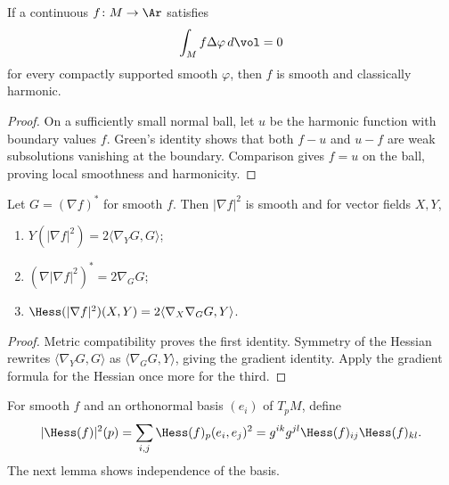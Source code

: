 \begin{theorem}
\label{thm:weak-harmonic-regularity}
\label{eqnlocmax}

If a continuous $f\colon M\to\Ar$ satisfies
$$\int_M f\Delta\varphi\,d\vol=0$$
for every compactly supported smooth $\varphi$, then $f$ is smooth and
classically harmonic.
\end{theorem}
\begin{proof}
\sketch
{}
On a sufficiently small normal ball, let $u$ be the harmonic function
with boundary values $f$. Green's identity shows that both $f-u$ and
$u-f$ are weak subsolutions vanishing at the boundary. Comparison gives
$f=u$ on the ball, proving local smoothness and harmonicity.
\end{proof}

\begin{lemma}
\label{lem:gradient-norm-sq-gradient}
\leanok



Let $G=(\nabla f)^*$ for smooth $f$. Then $|\nabla f|^2$ is smooth and
for vector fields $X,Y$,
\begin{enumerate}
\item $Y(|\nabla f|^2)=2\langle\nabla_YG,G\rangle$;
\item $(\nabla|\nabla f|^2)^*=2\nabla_GG$;
\item $\Hess(|\nabla f|^2)(X,Y)=2\langle\nabla_X\nabla_GG,Y\rangle$.
\end{enumerate}
\end{lemma}
\begin{proof}
\sketch
{}
\leanok
Metric compatibility proves the first identity. Symmetry of the Hessian
rewrites $\langle\nabla_YG,G\rangle$ as
$\langle\nabla_GG,Y\rangle$, giving the gradient identity. Apply the
gradient formula for the Hessian once more for the third.
\end{proof}

\begin{definition}
\label{def:hessian-norm-sq}
\leanok



For smooth $f$ and an orthonormal basis $(e_i)$ of $T_pM$, define
$$|\Hess(f)|^2(p)=\sum_{i,j}\Hess(f)_p(e_i,e_j)^2
=g^{ik}g^{jl}\Hess(f)_{ij}\Hess(f)_{kl}.$$
The next lemma shows independence of the basis.
\end{definition}


